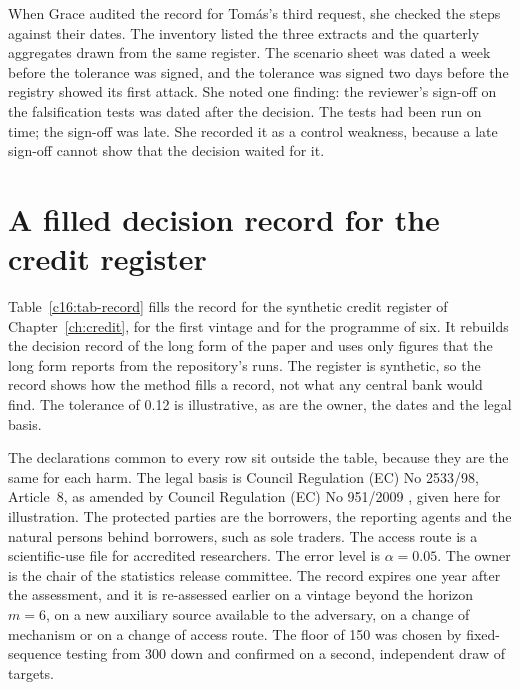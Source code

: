When Grace audited the record for Tomás's third request, she checked the steps
against their dates. The inventory listed the three extracts and the quarterly
aggregates drawn from the same register. The scenario sheet was dated a week before
the tolerance was signed, and the tolerance was signed two days before the registry
showed its first attack. She noted one finding: the reviewer's sign-off on the
falsification tests was dated after the decision. The tests had been run on time;
the sign-off was late. She recorded it as a control weakness, because a late
sign-off cannot show that the decision waited for it.

\section{A filled decision record for the credit register}

Table~\ref{c16:tab-record} fills the record for the synthetic credit register of
Chapter~\ref{ch:credit}, for the first vintage and for the programme of six. It
rebuilds the decision record of the long form of the paper and uses only figures that
the long form reports from the repository's runs.
The register is synthetic, so the record shows how the method fills a record, not
what any central bank would find. The tolerance of 0.12 is illustrative, as are the
owner, the dates and the legal basis.

The declarations common to every row sit outside the table, because they are the
same for each harm. The legal basis is Council Regulation (EC) No 2533/98,
Article~8, as amended by Council Regulation (EC) No 951/2009 \citep{ec2533,ec951},
given here for illustration. The protected parties are the borrowers, the reporting
agents and the natural persons behind borrowers, such as sole traders. The access
route is a scientific-use file for accredited researchers. The error level is
$\alpha = 0.05$. The owner is the chair of the statistics release committee. The
record expires one year after the assessment, and it is re-assessed earlier on a
vintage beyond the horizon $m = 6$, on a new auxiliary source available to the
adversary, on a change of mechanism or on a change of access route. The floor of 150
was chosen by fixed-sequence testing from 300 down and confirmed on a second,
independent draw of targets.

